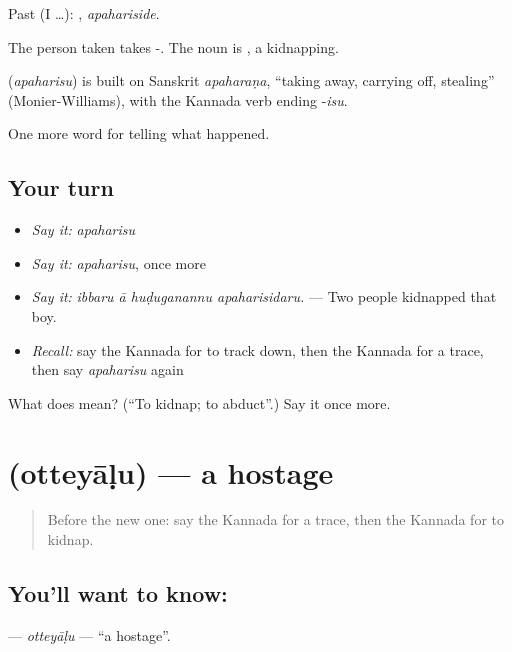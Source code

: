 Past (I …): , \emph{apahariside}.

The person taken takes -. The noun is , a kidnapping.

\begin{cousinweb}
\textbf{} (\emph{apaharisu}) is built on Sanskrit \emph{apaharaṇa}, \textquotedblleft{}taking away, carrying off, stealing\textquotedblright{} (Monier-Williams), with the Kannada verb ending -\emph{isu}.
\end{cousinweb}

\begin{grammarlens}[title={What you've built}]
One more word for telling what happened.
\end{grammarlens}

\subsection*{Your turn}
\begin{itemize}
\raggedright
  \item \emph{Say it:} \emph{apaharisu}
  \item \emph{Say it:} \emph{apaharisu}, once more
  \item \emph{Say it:} \emph{ibbaru ā huḍuganannu apaharisidaru.} — Two people kidnapped that boy.
  \item \emph{Recall:} say the Kannada for to track down, then the Kannada for a trace, then say \emph{apaharisu} again
\end{itemize}

\begin{tcolorbox}[breakable,colback=teal!4,colframe=teal!35!black,title={Before you move on}]
What does  mean? (\textquotedblleft{}To kidnap; to abduct\textquotedblright{}.) Say it once more.
\end{tcolorbox}
\section[\texorpdfstring{\kn{ಒತ್ತೆಯಾಳು} (otteyāḷu)}{ಒತ್ತೆಯಾಳು (otteyāḷu)}]{ (otteyāḷu) — a hostage}

\label{lesson:KA-C326-otteyalu}



\begin{quote}
Before the new one: say the Kannada for a trace, then the Kannada for to kidnap.
\end{quote}

\subsection*{You'll want to know: }
\textbf{} — \emph{otteyāḷu} — \textquotedblleft{}a hostage\textquotedblright{}.

